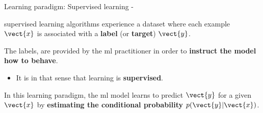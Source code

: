 %
%
%

\begin{frame}[t,allowframebreaks]{
    Learning paradigm: Supervised learning - }

\Gls{supervised learning} algorithms
experience a dataset where each example ${\vect{x}}$ 
is associated with a  {\bf label} (or {\bf target}) $\vect{y}$.\\
\vspace{0.2cm}

The labels, are provided by the \gls{ml} practitioner 
in order to {\bf instruct the model how to behave}.\\
\begin{itemize}
   \item It is in that sense that learning is {\bf supervised}. 
\end{itemize}
\vspace{0.2cm}

In this learning paradigm, the \gls{ml} model learns to predict 
$\vect{y}$ for a given $\vect{x}$ by 
{\bf estimating the conditional probability $p(\vect{y}|\vect{x})$}.

\end{frame}